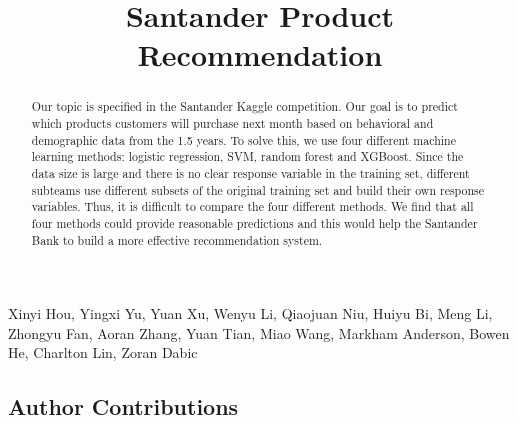 \documentclass{article}
\title{Santander Product Recommendation}
\begin{document}
	\maketitle
	\begin{center}\begin{Large} Xinyi Hou,
			Yingxi Yu,
			Yuan Xu,
			Wenyu Li,
			Qiaojuan Niu,
			Huiyu Bi,
			Meng Li,
			Zhongyu Fan,
			Aoran Zhang,
			Yuan Tian,
			Miao Wang,
			Markham Anderson,
			Bowen He,
			Charlton Lin,
			Zoran Dabic \end{Large}\end{center}
	\begin{spacing}{1}
		\begin{large}

\begin{abstract}
	 Our topic is specified in the Santander Kaggle competition. Our goal is to predict which products customers will purchase next month based on behavioral and demographic data from the 1.5 years. To solve this, we use four different machine learning methods: logistic regression, SVM, random forest and XGBoost. Since the data size is large and there is no clear response variable in the training set, different subteams use different subsets of the original training set and build their own response variables. Thus, it is difficult to compare the four different methods. We find that all four methods could provide reasonable predictions and this would help the Santander Bank to build a more effective recommendation system.
\end{abstract}

\section{Author Contributions}


\begin{multicols}{2}


\end{multicols}
\end{large}
\end{spacing}
\end{document}

